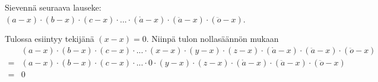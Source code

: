 \begin{tehtava}
    Sievennä seuraava lauseke: $(a-x)\cdot(b-x)\cdot(c-x)\cdot...\cdot(\mathring{a}-x)\cdot(\ddot{a}-x)\cdot(\ddot{o}-x)$.
    \begin{vastaus}
        Tulossa esiintyy tekijänä $(x-x)=0$. Niinpä tulon nollasäännön mukaan
        \begin{align*}
            &(a-x)\cdot(b-x)\cdot(c-x)\cdot...\cdot(x-x)\cdot(y-x)\cdot(z-x)\cdot(\mathring{a}-x)\cdot(\ddot{a}-x)\cdot(\ddot{o}-x) \\
            =&(a-x)\cdot(b-x)\cdot(c-x)\cdot...\cdot 0\cdot(y-x)\cdot(z-x)\cdot(\mathring{a}-x)\cdot(\ddot{a}-x)\cdot(\ddot{o}-x) \\
            =&0
        \end{align*}
    \end{vastaus}
\end{tehtava}
